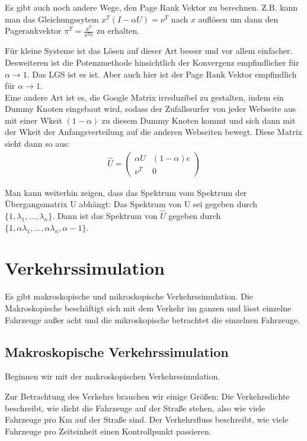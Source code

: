 \documentclass[]{article}
\begin{document}
Es gibt auch noch andere Wege, den Page Rank Vektor zu berechnen. Z.B. kann man das Gleichungssytem $x^T (I - \alpha U)= \nu^T$ nach $x$ auflösen um dann den Pagerankvektor $\pi^T= \frac{x^T}{x^T e}$ zu erhalten. 

Für kleine Systeme ist das Lösen auf dieser Art besser und vor allem einfacher. Desweiteren ist die Potenzmethode hinsichtlich der Konvergenz empfindlicher für $\alpha \rightarrow 1$. Das LGS ist es ist. Aber auch hier ist der Page Rank Vektor empfindlich für $\alpha \rightarrow 1$. \\

Eine andere Art ist es, die Google Matrix irreduzibel zu gestalten, indem ein Dummy Knoten eingebaut wird, sodass der Zufallssurfer von jeder Webseite aus mit einer Wkeit $(1-\alpha)$ zu diesem Dummy Knoten kommt und sich dann mit der Wkeit der Anfangsverteilung auf die anderen Webseiten bewegt. Diese Matrix sieht dann so aus: 
\begin{align*}
	\hat{U}= 
	\begin{pmatrix}
		\alpha U & (1-\alpha) e \\
		\nu^T & 0 
	\end{pmatrix}
\end{align*}   

Man kann weiterhin zeigen, dass das Spektrum vom Spektrum der Übergangsmatrix U abhängt: Das Spektrum von U sei gegeben durch $\{1, \lambda_1 ,\dots, \lambda_n \}$. Dann ist das Spektrum von $\hat{U}$ gegeben durch $\{1, \alpha \lambda_1, \dots , \alpha \lambda_n, \alpha -1\}$. 


\section{Verkehrssimulation}
Es gibt makroskopische und mikroskopische Verkehrssimulation. Die Makroskopische beschäftigt sich mit dem Verkehr im ganzen und lässt einzelne Fahrzeuge außer acht und die mikroskopische betrachtet die einzelnen Fahrzeuge. 

\subsection{Makroskopische Verkehrssimulation}

Beginnen wir mit der makroskopischen Verkehrssimulation. 

Zur Betrachtung des Verkehrs brauchen wir einige Größen: Die Verkehrsdichte beschreibt, wie dicht die Fahrzeuge auf der Straße stehen, also wie viele Fahrzeuge pro Km auf der Straße sind. Der Verkehrsfluss beschreibt, wie viele Fahrzeuge pro Zeiteinheit einen Kontrollpunkt passieren.
\end{document}
